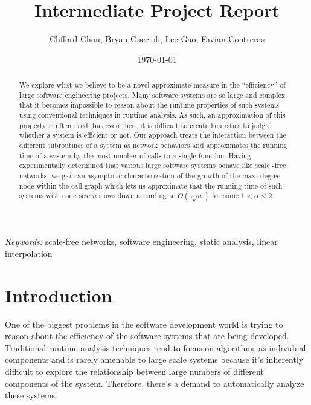 \documentclass[11pt,a4paper]{article}
\author{Clifford Chou, Bryan Cuccioli, Lee Gao, 
Favian Contreras}
\date{\today}
\title{\textbf{Intermediate Project Report}} %
\begin{document}


\renewcommand{\abstractname}{Abstract} %
\begin{singlespace}
\maketitle
\begin{abstract}
We explore what we believe to be a novel approximate measure in the 
``efficiency'' of large software engineering projects. Many software systems 
are so large and complex that it becomes impossible to reason about the 
runtime properties of such systems using conventional techniques in runtime 
analysis. As such, an approximation of this property is often used, but even then, it is difficult to create heuristics to judge whether a system is 
efficient or not. Our approach treats the interaction between the different 
subroutines of a system as network behaviors and approximates the running time 
of a system by the most number of calls to a single function. Having 
experimentally determined that various large software systems behave like scale
-free networks, we gain an asymptotic characterization of the growth of the max
-degree node within the call-graph which lets us approximate that the running 
time of such systems with code size $n$ slows down according to 
$O(\sqrt[\alpha]{n})$ for some $1 < \alpha \le 2$.
\end{abstract}

\hspace*{3,6mm}\textit{Keywords:} {\sf \small  scale-free networks, software 
engineering, static analysis, linear interpolation} %
\end{singlespace}
\vspace{30pt} %


\section*{Introduction}
One of the biggest problems in the software development world is trying to 
reason about the efficiency of the software systems that are being developed. 
Traditional runtime analysis techniques tend to focus on algorithms as 
individual components and is rarely amenable to large scale systems because 
it's inherently difficult to explore the relationship between large numbers of 
different components of the system. Therefore, there's a demand to 
automatically analyze these systems.
\end{document}

